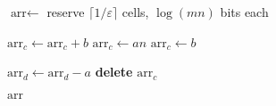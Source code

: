 \documentclass{article}
\let\temp\epsilon
\let\epsilon\varepsilon
\let\varepsilon\temp
\begin{document}
  \begin{center}
    \begin{minipage}{13cm}
      \hrulefill
      \begin{algorithmic}[1]
        \State $\textrm{arr} \gets$ reserve $\lceil 1/\epsilon \rceil$ cells, $\log (mn)$ bits each

         
           
            \State $\textrm{arr}_c \gets \textrm{arr}_c + b$ 
              \State $\textrm{arr}_c \gets an$
            \EndIf
          \Else
            \State $\textrm{arr}_c \gets b$ 
          \EndIf

            \State $\textrm{arr}_d \gets \textrm{arr}_d - a$
              \State \textbf{delete} $\textrm{arr}_c$ 
            \EndIf
          \EndFor
        \EndWhile

        \State \Return $\textrm{arr}$
      \end{algorithmic}
      \hrulefill
    \end{minipage}
  \end{center}
\end{document}
